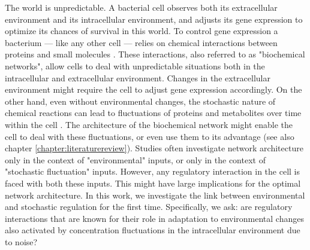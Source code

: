 The world is unpredictable.
%
A bacterial cell observes both its extracellular environment and its intracellular environment,
and adjusts its gene expression to 
optimize its chances of survival in this world.
%
To control gene expression a bacterium --- like any other cell --- relies on chemical interactions between proteins and small molecules \cite{Bray1995, Alon2006, Alon2007, Tyson2010}.
These interactions, also referred to as "biochemical networks", 
%
allow cells to deal with 
unpredictable situations
both in the intracellular and extracellular environment.
%
Changes in the extracellular environment might require the cell to adjust gene expression accordingly.
%
On the other hand,  even without environmental changes, the stochastic nature of chemical reactions can lead to fluctuations of proteins and metabolites over time within the cell \cite{Elowitz2002,Kiviet2014}.
The architecture of the biochemical network might enable the cell to deal with these fluctuations, or even use them to its advantage (see also chapter \ref{chapter:literaturereview}).
%
Studies often investigate network architecture only in the context of "environmental" inputs, or only in the context of "stochastic fluctuation" inputs.
%
However, any regulatory interaction in the cell is faced with both these inputs.
%
This might have large implications for the optimal network architecture.
%
In this work, we investigate the link between environmental and stochastic regulation for the first time. %
%
Specifically, we ask:
are regulatory interactions that are known for their role in adaptation to environmental changes also 
activated 
by concentration fluctuations in the intracellular environment due to noise?


